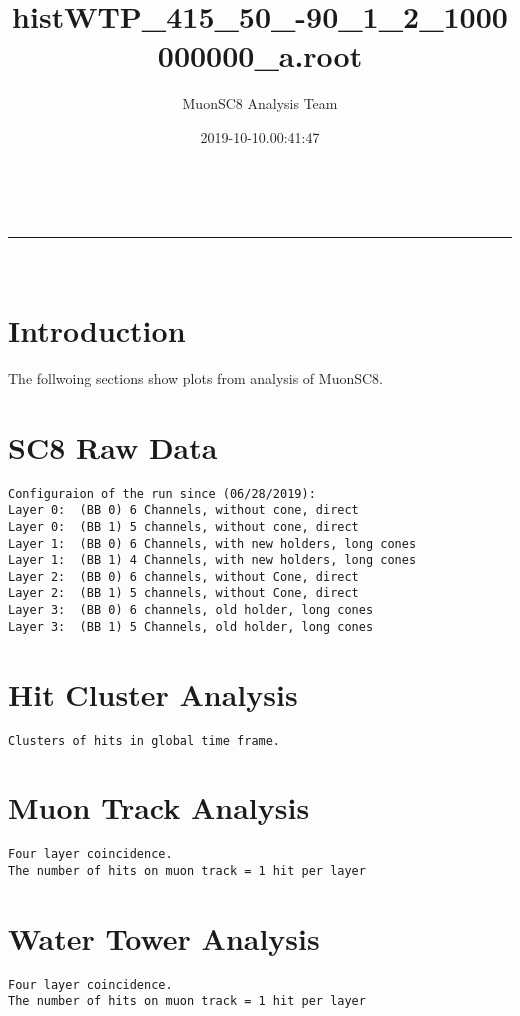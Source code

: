 \documentclass[a4paper,11pt]{article}
\makeatletter
\newcommand{\linia}{\rule{\linewidth}{0.5pt}}
\theoremstyle{mytheor}
\renewcommand{\maketitle}{
\begin{center}
\vspace{2ex}
{\huge \textsc{\@title}}
\vspace{1ex}
\\
\linia\\
\@author \hfill \@date
\vspace{4ex}
\end{center}
}
\makeatother
\begin{document}
\title{histWTP\_415\_50\_-90\_1\_2\_1000000000\_a.root}

\author{MuonSC8 Analysis Team }

\date{2019-10-10.00:41:47}

\maketitle

\section{Introduction}

The follwoing sections show plots from analysis of MuonSC8. 






\section{SC8 Raw Data} 
\begin{verbatim} 
Configuraion of the run since (06/28/2019): 
Layer 0:  (BB 0) 6 Channels, without cone, direct 
Layer 0:  (BB 1) 5 channels, without cone, direct 
Layer 1:  (BB 0) 6 Channels, with new holders, long cones 
Layer 1:  (BB 1) 4 Channels, with new holders, long cones 
Layer 2:  (BB 0) 6 channels, without Cone, direct 
Layer 2:  (BB 1) 5 channels, without Cone, direct 
Layer 3:  (BB 0) 6 channels, old holder, long cones 
Layer 3:  (BB 1) 5 Channels, old holder, long cones 
\end{verbatim} 
\newpage 
\section{Hit Cluster Analysis} 
\begin{verbatim} 
Clusters of hits in global time frame. 
\end{verbatim} 
\newpage 
\section{Muon Track Analysis} 
\begin{verbatim} 
Four layer coincidence. 
The number of hits on muon track = 1 hit per layer  
\end{verbatim} 
\newpage 
\section{Water Tower Analysis} 
\begin{verbatim} 
Four layer coincidence. 
The number of hits on muon track = 1 hit per layer 
\end{verbatim} 
\end{document}
